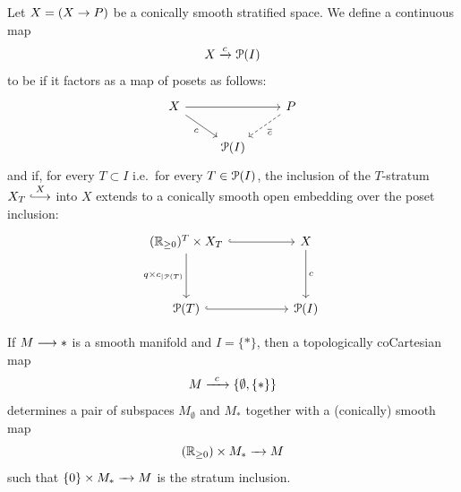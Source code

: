 \begin{definition}\cite[Definition 7.2.2]{AFT1}\label{ch4:: def: top coCartesian}
    Let $X = (X \rightarrow P)$ be a conically smooth stratified space. We define a continuous map 
    \begin{equation}
        X \xrightarrow{c} \mathcal P(I)
    \end{equation}
    to be  if it factors as a map of posets as follows:
    \begin{equation}
        \begin{tikzcd}[ampersand replacement=\&]
            X \&\& P \\
            \& {\cP(I)}
            \arrow[from=1-1, to=1-3]
            \arrow["c"', from=1-1, to=2-2]
            \arrow["{\overline{c}}", dashed, from=1-3, to=2-2]
        \end{tikzcd}
    \end{equation} 
    and if, for every $T \subset I$ i.e.\ for every $T \in \mathcal P(I)$, the inclusion of the $T$-stratum $ X_T \xlonghookra X$ into $X$ extends to a conically smooth open embedding over the poset inclusion:
    \begin{equation}
        \begin{tikzcd}[ampersand replacement=\&]
            {(\RR_{\geq 0})^{T} \times X_T} \&\& X \\
            \\
            {\cP(T)} \&\& {\cP(I)}
            \arrow[hook, from=1-1, to=1-3]
            \arrow["{q\times c_{|\cP(T)}}"', from=1-1, to=3-1]
            \arrow["c", from=1-3, to=3-3]
            \arrow[hook, from=3-1, to=3-3]
        \end{tikzcd}
    \end{equation}
\end{definition} 

\begin{example}
    If $M \longrightarrow *$ is a smooth manifold and $I = \{*\}$, then a topologically coCartesian map
    \begin{equation}
        M \xrightarrow{\;\; c \;\;} \{\emptyset, \{*\}\}
    \end{equation}  
    determines a pair of subspaces $M_{\emptyset}$ and $M_{*}$ together with a (conically) smooth map 
    \begin{equation}
        (\mathbb R_{\geq 0}) \times M_{*} \xrightarrow{\;\;\;} M
    \end{equation}
    such that $\{0\}\times M_\ast \xrightarrow{\;\;\;} M$ is the stratum inclusion. 
\end{example}

